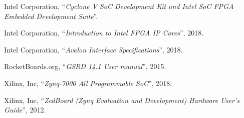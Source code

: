 \begin{thebibliography}{1}
  Intel Corporation,
  ``\textit{Cyclone V SoC Development Kit and Intel SoC FPGA Embedded
  Development Suite}''.

  Intel Corporation,
  ``\textit{Introduction to Intel FPGA IP Cores}'',
  2018.

  Intel Corporation,
  ``\textit{Avalon Interface Specifications}'',
  2018.

  RocketBoards.org,
  ``\textit{GSRD 14.1 User manual}'',
  2015.

  Xilinx, Inc,
  ``\textit{Zynq-7000 All Programmable SoC}'',
  2018.

  Xilinx, Inc,
  ``\textit{ZedBoard (Zynq Evaluation and Development) Hardware User's Guide}'',
  2012.
\end{thebibliography}